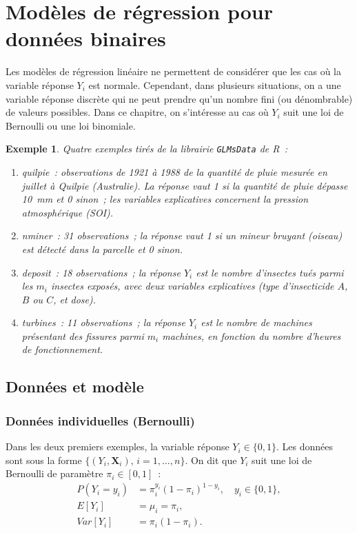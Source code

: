 \documentclass[11pt,letterpaper]{article}
\newtheorem{exemple}{Exemple}[section]
\begin{document}
\section{Modèles de régression pour données binaires}
\label{sec:logistique}

Les modèles de régression linéaire ne permettent de considérer que les cas où la variable réponse $Y_i$ est normale. Cependant, dans plusieurs situations, on a une variable réponse discrète qui ne peut prendre qu'un nombre fini (ou dénombrable) de valeurs possibles. Dans ce chapitre, on s'intéresse au cas où $Y_i$ suit une loi de Bernoulli ou une loi binomiale.

\begin{exemple}
Quatre exemples tirés de la librairie \texttt{GLMsData} de \textrm{R}~:
\begin{enumerate}
\item \textsf{quilpie}~: observations de 1921 à 1988 de la quantité de pluie mesurée en juillet à Quilpie (Australie). La réponse vaut 1 si la quantité de pluie dépasse 10~mm et 0 sinon~; les variables explicatives concernent la pression atmosphérique (SOI).
\item \textsf{nminer}~: 31 observations~; la réponse vaut 1 si un mineur bruyant (oiseau) est détecté dans la parcelle et 0 sinon.
\item \textsf{deposit}~: 18 observations~; la réponse $Y_i$ est le nombre d'insectes tués parmi les $m_i$ insectes exposés, avec deux variables explicatives (type d'insecticide $A$, $B$ ou $C$, et dose).
\item \textsf{turbines}~: 11 observations~; la réponse $Y_i$ est le nombre de machines présentant des fissures parmi $m_i$ machines, en fonction du nombre d'heures de fonctionnement.
\end{enumerate}
\end{exemple}

\subsection{Données et modèle}

\subsubsection{Données individuelles (Bernoulli)}

Dans les deux premiers exemples, la variable réponse $Y_i \in \{0,1\}$. Les données sont sous la forme $\{(Y_i,\boldsymbol{X}_i),\, i=1,\ldots,n\}$. On dit que $Y_i$ suit une loi de Bernoulli de paramètre $\pi_i \in [0,1]$~:
\begin{align*}
P(Y_i = y_i) &= \pi_i^{y_i}(1-\pi_i)^{1-y_i}, \quad y_i \in \{0,1\},\\
E[Y_i] &= \mu_i = \pi_i,\\
Var[Y_i] &= \pi_i(1-\pi_i).
\end{align*}
\end{document}
